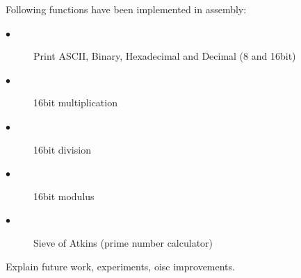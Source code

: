 \documentclass[portrait,color=UCLmidgreen,margin=1.5cm,bannerheight=8cm,logoheight=2.5cm]{uclposter}
\begin{document}
\begin{tcolorbox}[title=Results]
	Following functions have been implemented in assembly:
	\begin{description}
		\item[$\bullet$] Print ASCII, Binary, Hexadecimal and Decimal (8 and 16bit)
		\item[$\bullet$] 16bit multiplication
		\item[$\bullet$] 16bit division 
		\item[$\bullet$] 16bit modulus
		\item[$\bullet$] Sieve of Atkins (prime number calculator)
	\end{description}
\end{tcolorbox}


\begin{tcolorbox}[title=Future work]
Explain future work, experiments, oisc improvements.
\end{tcolorbox}
\end{document}
